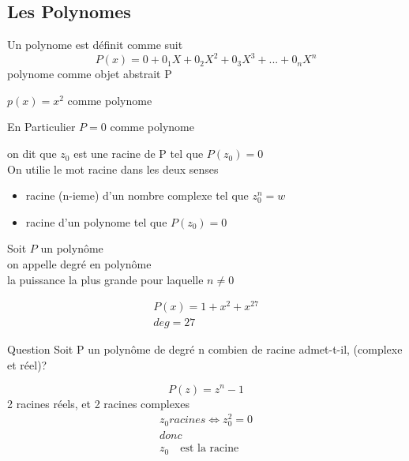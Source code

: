 \subsection{Les Polynomes}
Un polynome est définit comme suit
\begin{equation*}
	P(x) = 0+0_1X+0_2X^2+0_3X^3+...+0_nX^n 
\end{equation*}
polynome comme objet abstrait P \\
\begin{example}
	$p(x)=x^2$ comme polynome
\end{example}
\begin{example}{En Particulier}
	$P=0$ comme polynome \\
\end{example}

\begin{definition}
	on dit que $z_0$ est une racine de P tel que $P(z_0)=0$ \\
	On utilie le mot racine dans les deux senses
	\begin{itemize}
		\item racine (n-ieme) d'un nombre complexe tel que $z_0^n=w$
		\item racine d'un polynome tel que $P(z_0)=0$
	\end{itemize}
\end{definition}

\begin{definition}
	Soit $P$ un polynôme \\
	on appelle degré en polynôme \\
	la puissance la plus grande pour laquelle $n \neq 0$
	\begin{example}
		\begin{align*}
			P(x) = 1+x^2+x^27\\ 
			deg=27
		\end{align*}
	\end{example}
	\begin{definition}{Question}
		Soit P un polynôme de degré n
		combien de racine admet-t-il, (complexe et réel)?
		\begin{example}
			\begin{equation*}
				P(z)=z^n-1
   			\end{equation*}
			2 racines réels, et 2 racines complexes
			\begin{align*}
				z_0 racines \iff z_0^2 = 0 \\
				donc \\
				z_0 \quad \text{est la racine}
   			\end{align*}
		\end{example}
	\end{definition}
\end{definition}


